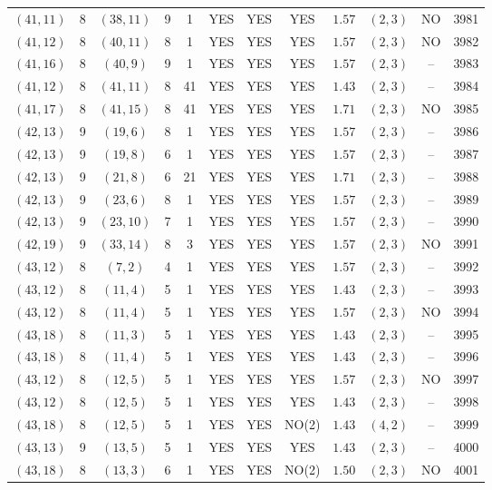\begin{longtable}{|c|c|c|c|c|c|c|c|c|c|c|c|}
$(41,11)$ & 8 & $(38,11)$ & 9 & 1 & YES & YES & YES & $1.57$ & $(2,3)$ & NO & 3981\\
$(41,12)$ & 8 & $(40,11)$ & 8 & 1 & YES & YES & YES & $1.57$ & $(2,3)$ & NO & 3982\\
$(41,16)$ & 8 & $(40,9)$ & 9 & 1 & YES & YES & YES & $1.57$ & $(2,3)$ & -- & 3983\\
$(41,12)$ & 8 & $(41,11)$ & 8 & 41 & YES & YES & YES & $1.43$ & $(2,3)$ & -- & 3984\\
$(41,17)$ & 8 & $(41,15)$ & 8 & 41 & YES & YES & YES & $1.71$ & $(2,3)$ & NO & 3985\\
$(42,13)$ & 9 & $(19,6)$ & 8 & 1 & YES & YES & YES & $1.57$ & $(2,3)$ & -- & 3986\\
$(42,13)$ & 9 & $(19,8)$ & 6 & 1 & YES & YES & YES & $1.57$ & $(2,3)$ & -- & 3987\\
$(42,13)$ & 9 & $(21,8)$ & 6 & 21 & YES & YES & YES & $1.71$ & $(2,3)$ & -- & 3988\\
$(42,13)$ & 9 & $(23,6)$ & 8 & 1 & YES & YES & YES & $1.57$ & $(2,3)$ & -- & 3989\\
$(42,13)$ & 9 & $(23,10)$ & 7 & 1 & YES & YES & YES & $1.57$ & $(2,3)$ & -- & 3990\\
$(42,19)$ & 9 & $(33,14)$ & 8 & 3 & YES & YES & YES & $1.57$ & $(2,3)$ & NO & 3991\\
$(43,12)$ & 8 & $(7,2)$ & 4 & 1 & YES & YES & YES & $1.57$ & $(2,3)$ & -- & 3992\\
$(43,12)$ & 8 & $(11,4)$ & 5 & 1 & YES & YES & YES & $1.43$ & $(2,3)$ & -- & 3993\\
$(43,12)$ & 8 & $(11,4)$ & 5 & 1 & YES & YES & YES & $1.57$ & $(2,3)$ & NO & 3994\\
$(43,18)$ & 8 & $(11,3)$ & 5 & 1 & YES & YES & YES & $1.43$ & $(2,3)$ & -- & 3995\\
$(43,18)$ & 8 & $(11,4)$ & 5 & 1 & YES & YES & YES & $1.43$ & $(2,3)$ & -- & 3996\\
$(43,12)$ & 8 & $(12,5)$ & 5 & 1 & YES & YES & YES & $1.57$ & $(2,3)$ & NO & 3997\\
$(43,12)$ & 8 & $(12,5)$ & 5 & 1 & YES & YES & YES & $1.43$ & $(2,3)$ & -- & 3998\\
$(43,18)$ & 8 & $(12,5)$ & 5 & 1 & YES & YES & NO(2) & $1.43$ & $(4,2)$ & -- & 3999\\
$(43,13)$ & 9 & $(13,5)$ & 5 & 1 & YES & YES & YES & $1.43$ & $(2,3)$ & -- & 4000\\
$(43,18)$ & 8 & $(13,3)$ & 6 & 1 & YES & YES & NO(2) & $1.50$ & $(2,3)$ & NO & 4001\\

\end{longtable}
